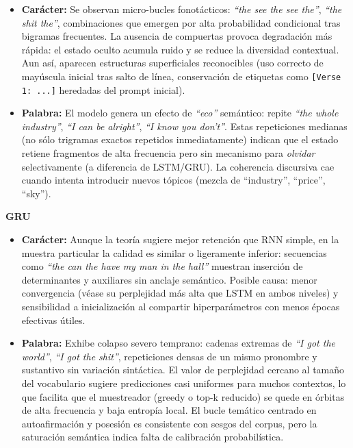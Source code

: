 \documentclass[paper=letter, fontsize=11pt, draft=false]{scrartcl}
\numberwithin{equation}{section} %
\numberwithin{figure}{section} %
\numberwithin{table}{section} %
\numberwithin{subsection}{section}
\begin{document}
\begin{itemize}
    \item \textbf{Carácter:} Se observan micro-bucles fonotácticos: \textit{``the see the see the''}, \textit{``the shit the''}, combinaciones que emergen por alta probabilidad condicional tras bigramas frecuentes. La ausencia de compuertas provoca degradación más rápida: el estado oculto acumula ruido y se reduce la diversidad contextual. Aun así, aparecen estructuras superficiales reconocibles (uso correcto de mayúscula inicial tras salto de línea, conservación de etiquetas como \texttt{[Verse 1: ...]} heredadas del prompt inicial).
    \item \textbf{Palabra:} El modelo genera un efecto de \textit{``eco''} semántico: repite \textit{``the whole industry''}, \textit{``I can be alright''}, \textit{``I know you don't''}. Estas repeticiones medianas (no sólo trigramas exactos repetidos inmediatamente) indican que el estado retiene fragmentos de alta frecuencia pero sin mecanismo para \emph{olvidar} selectivamente (a diferencia de LSTM/GRU). La coherencia discursiva cae cuando intenta introducir nuevos tópicos (mezcla de ``industry'', ``price'', ``sky'').
\end{itemize}


\textbf{GRU}

\begin{itemize}
    \item \textbf{Carácter:} Aunque la teoría sugiere mejor retención que RNN simple, en la muestra particular la calidad es similar o ligeramente inferior: secuencias como \textit{``the can the have my man in the hall''} muestran inserción de determinantes y auxiliares sin anclaje semántico. Posible causa: menor convergencia (véase su perplejidad más alta que LSTM en ambos niveles) y sensibilidad a inicialización al compartir hiperparámetros con menos épocas efectivas útiles.
    \item \textbf{Palabra:} Exhibe colapso severo temprano: cadenas extremas de \textit{``I got the world''}, \textit{``I got the shit''}, repeticiones densas de un mismo pronombre y sustantivo sin variación sintáctica. El valor de perplejidad cercano al tamaño del vocabulario sugiere predicciones casi uniformes para muchos contextos, lo que facilita que el muestreador (greedy o top-k reducido) se quede en órbitas de alta frecuencia y baja entropía local. El bucle temático centrado en autoafirmación y posesión es consistente con sesgos del corpus, pero la saturación semántica indica falta de calibración probabilística.
\end{itemize}
\end{document}
